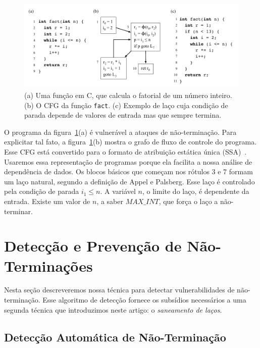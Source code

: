 \documentclass{llncs}
\begin{document}
\begin{figure}[t!]
\begin{center}
\includegraphics[width=1\textwidth]{images/fact}
\caption{(a) Uma função em C, que calcula o fatorial de um número inteiro.
(b) O CFG da função \texttt{fact}.
(c) Exemplo de laço cuja condição de parada depende de valores de entrada
mas que sempre termina.}
\label{fig:fact}
\end{center}
\end{figure}

O programa da figura~\ref{fig:fact}(a) é vulnerável a ataques de
não-terminação.
Para explicitar tal fato, a figura~\ref{fig:fact}(b) mostra o grafo de
fluxo de controle do programa.
Esse CFG está convertido para o formato de atribuição estática única
(SSA)~\cite{Cytron91}.
Usaremos essa representação de programas porque ela facilita a nossa análise
de dependência de dados.
Os blocos básicos que começam nos rótulos 3 e 7 formam um laço natural,
segundo a definição de Appel e Palsberg.
Esse laço é controlado pela condição de parada $i_1 \leq n$.
A variável $n$, o limite do laço, é dependente da entrada.
Existe um valor de $n$, a saber $\mathit{MAX\_INT}$, que força o laço a
não-terminar.

\section{Detecção e Prevenção de Não-Terminações}
\label{sec:sol}

Nesta seção descreveremos nossa técnica para detectar vulnerabilidades de
não-terminação.
Esse algoritmo de detecção fornece os subsídios necessários a uma segunda
técnica que introduzimos neste artigo: o {\em saneamento de laços}.

\subsection{Detecção Automática de Não-Terminação}
\label{sub:det}
\end{document}
